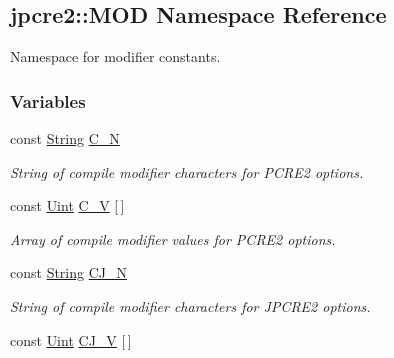 \hypertarget{namespacejpcre2_1_1MOD}{}\subsection{jpcre2\+:\+:M\+OD Namespace Reference}
\label{namespacejpcre2_1_1MOD}


Namespace for modifier constants.  


\subsubsection*{Variables}
\begin{DoxyCompactItemize}
\item 
const \hyperlink{namespacejpcre2_a91f03070152fb228bc116c5a737f1d16}{String} \hyperlink{namespacejpcre2_1_1MOD_a3b72b258386dc5ea4a23504e89908247}{C\+\_\+N}\hypertarget{namespacejpcre2_1_1MOD_a3b72b258386dc5ea4a23504e89908247}{}\label{namespacejpcre2_1_1MOD_a3b72b258386dc5ea4a23504e89908247}

\begin{DoxyCompactList}\small\item\em String of compile modifier characters for P\+C\+R\+E2 options. \end{DoxyCompactList}\item 
const \hyperlink{namespacejpcre2_a078242d38221a13fb3543b9edd78c099}{Uint} \hyperlink{namespacejpcre2_1_1MOD_a78025b5470499fcedb9f9bcb7cc0060b}{C\+\_\+V} \mbox{[}$\,$\mbox{]}\hypertarget{namespacejpcre2_1_1MOD_a78025b5470499fcedb9f9bcb7cc0060b}{}\label{namespacejpcre2_1_1MOD_a78025b5470499fcedb9f9bcb7cc0060b}

\begin{DoxyCompactList}\small\item\em Array of compile modifier values for P\+C\+R\+E2 options. \end{DoxyCompactList}\item 
const \hyperlink{namespacejpcre2_a91f03070152fb228bc116c5a737f1d16}{String} \hyperlink{namespacejpcre2_1_1MOD_aa17f8c8525a87009846a6b9d9e3d1336}{C\+J\+\_\+N}\hypertarget{namespacejpcre2_1_1MOD_aa17f8c8525a87009846a6b9d9e3d1336}{}\label{namespacejpcre2_1_1MOD_aa17f8c8525a87009846a6b9d9e3d1336}

\begin{DoxyCompactList}\small\item\em String of compile modifier characters for J\+P\+C\+R\+E2 options. \end{DoxyCompactList}\item 
const \hyperlink{namespacejpcre2_a078242d38221a13fb3543b9edd78c099}{Uint} \hyperlink{namespacejpcre2_1_1MOD_a455f33361efc25e03e5a8613de8a0fa0}{C\+J\+\_\+V} \mbox{[}$\,$\mbox{]}\hypertarget{namespacejpcre2_1_1MOD_a455f33361efc25e03e5a8613de8a0fa0}{}\label{namespacejpcre2_1_1MOD_a455f33361efc25e03e5a8613de8a0fa0}


\end{DoxyCompactItemize}
